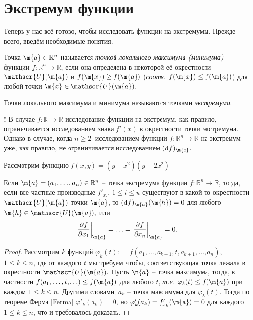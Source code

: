\section{Экстремум функции}

Теперь у нас всё готово, чтобы исследовать функции на экстремумы. Прежде всего, введём необходимые понятия.

\begin{definition}
    Точка $\m{a} \in \mathbb{R}^n$ называется \textit{точкой локального максимума (минимума)} функции $f:\mathbb{R}^n \to \mathbb{R}$, если она определена в некоторой её окрестности $\mathscr{U}(\m{a})$ и $f(\m{x}) \ge f(\m{a})$ (\textit{соотв.} $f(\m{x}) \le f(\m{a})$) для любой точки $\m{x} \in \mathscr{U}(\m{a}).$

Точки локального максимума и минимума называются точками \textit{экстремума.}
\end{definition}

\begin{mydanger}{\bf{!}}
    В случае $f:\mathbb{R} \to \mathbb{R}$ исследование функции на экстремум, как правило, ограничивается исследованием знака $f'(x)$ в окрестности точки экстремума. Однако в случае, когда $n\ge 2$, исследованием функции $f:\mathbb{R}^n \to \mathbb{R}$ на экстремум уже, как правило, не ограничивается исследованием $(\mathrm{d}f)_\m{a}.$ 
\end{mydanger}

\begin{example}
    Рассмотрим функцию $f(x,y) = (y-x^2)(y-2x^2)$
\end{example}

\begin{theorem}\label{nessary_condition_for_extr}
    Если $\m{a} = (a_1,\ldots, a_n) \in \mathbb{R}^n$ -- точка экстремума функции $f:\mathbb{R}^n \to \mathbb{R}$, тогда, если все частные производные $f'_{x_i}$, $1\le i \le n$ существуют в какой-то окрестности $\mathscr{U}(\m{a})$ точки $\m{a}$, то $(\mathrm{d}f)_\m{a}(\m{h}) = 0$ для любого $\m{h} \in \mathscr{U}(\m{a}),$ или
    \[
     \left.\frac{\partial f}{\partial x_1}\right|_\m{a} = \ldots = \left.\frac{\partial f}{\partial x_n}\right|_\m{a} = 0.   
    \]
\end{theorem}
\begin{proof}
    Рассмотрим $k$ функций $\varphi_k(t): = f(a_1,\ldots, a_{k-1}, t, a_{k+1}, \ldots, a_n)$, $1 \le k \le n$, где от каждого $t$ мы требуем чтобы, соответствующая точка лежала в окрестности $\mathscr{U}(\m{a}).$ Пусть $\m{a}$ -- точка максимума, тогда, в частности $f(a_1, \ldots, t, \ldots) \le f(\m{a})$ для любого $t$, \textit{т.е.} $\varphi_k(t) \le f(\m{a})$ при каждом $1 \le k \le n$. Другими словами, $a_k$ -- точка максимума для $\varphi_k(t)$. Тогда по теореме Ферма \ref{Ferma} $\varphi'_k(a_k) = 0$, но $\varphi'_k(a_k) = f'_{x_k}(\m{a}) = 0$ для каждого $1 \le k \le n$, что и требовалось доказать.
\end{proof}



